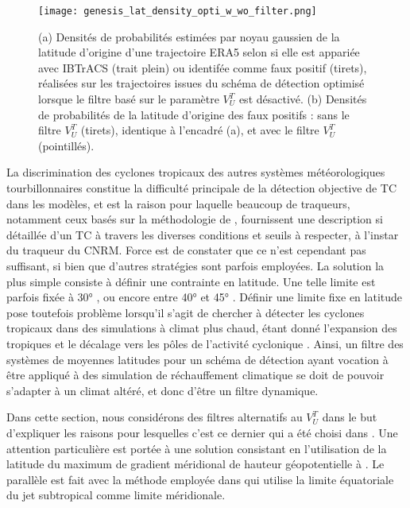\documentclass[../main.tex]{subfiles}
\begin{document}
\begin{figure}[tb]
    \centering
    \texttt{[image: genesis\_lat\_density\_opti\_w\_wo\_filter.png]}
    \caption{(a) Densités de probabilités estimées par noyau gaussien de la latitude d'origine d'une trajectoire ERA5 selon si elle est appariée avec IBTrACS
    (trait plein) ou identifée comme faux positif (tirets), réalisées sur les trajectoires issues du schéma de détection optimisé lorsque le filtre basé sur
    le paramètre $V_U^T$ est désactivé. (b) Densités de probabilités de la latitude d'origine des faux positifs : sans le filtre $V_U^T$ (tirets), identique
    à l'encadré (a), et avec le filtre $V_U^T$ (pointillés).}
    \label{fig:lat_density}
\end{figure}

La discrimination des cyclones tropicaux des autres systèmes météorologiques tourbillonnaires constitue la difficulté principale de la détection objective de TC
dans les modèles, et est la raison pour laquelle beaucoup de traqueurs, notamment ceux basés sur la méthodologie de \textcite{bengtsson_hurricanetype_1995},
fournissent une description si détaillée d'un TC à travers les diverses conditions et seuils à respecter, à l'instar du traqueur du CNRM. Force est de constater
que ce n'est cependant pas suffisant, si bien que d'autres stratégies sont parfois employées. La solution la plus simple consiste à définir une contrainte en
latitude. Une telle limite est parfois fixée à \ang{30} \parencite{bengtsson_simulation_1982,broccoli_can_1990,mcdonald_tropical_2005}, ou encore entre \ang{40}
et \ang{45} \parencite{wu_gcm_1992,tsutsui_simulated_1996,tsutsui_implications_2002,oouchi_tropical_2006,zarzycki_multidecadal_2014}. Définir une limite fixe en
latitude pose toutefois problème lorsqu'il s'agit de chercher à détecter les cyclones tropicaux dans des simulations à climat plus chaud, étant donné
l'expansion des tropiques \parencite{lucas_expanding_2014,staten_reexamining_2018} et le décalage vers les pôles de l'activité cyclonique
\parencite{kossin_poleward_2014,knutson_tropical_2020}. Ainsi, un filtre des systèmes de moyennes latitudes pour un schéma de détection ayant vocation à être
appliqué à des simulation de réchauffement climatique se doit de pouvoir s'adapter à un climat altéré, et donc d'être un filtre dynamique.

Dans cette section, nous considérons des filtres alternatifs au $V_U^T$ dans le but d'expliquer les raisons pour lesquelles c'est ce dernier qui a été choisi
dans \textcite{dulac_assessing_2023}. Une attention particulière est portée à une solution consistant en l'utilisation de la latitude du maximum de gradient
méridional de hauteur géopotentielle à . Le parallèle est fait avec la méthode employée dans \textcite{bourdin_intercomparison_2022} qui utilise la limite
équatoriale du jet subtropical comme limite méridionale.
\end{document}
